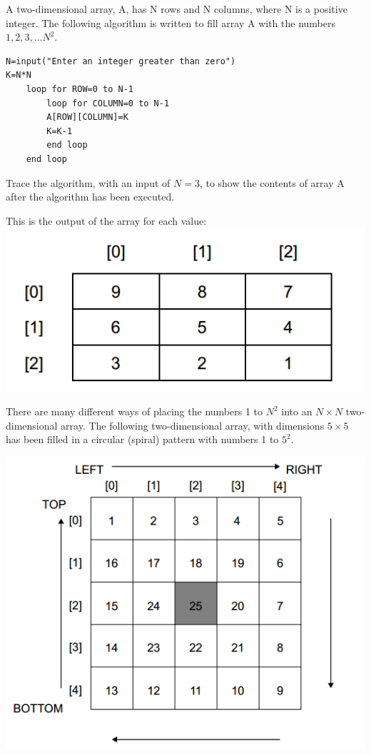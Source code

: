 \begin{exercise*}%
A two-dimensional array, A, has N rows and N columns, where N is a positive integer.
The following algorithm is written to fill array A with the numbers $1, 2, 3,\ldots N^2$.
\begin{verbatim}
N=input("Enter an integer greater than zero")
K=N*N
	loop for ROW=0 to N-1
		loop for COLUMN=0 to N-1
		A[ROW][COLUMN]=K
		K=K-1
		end loop
	end loop
\end{verbatim}

\begin{parts}
\item Trace the algorithm, with an input of $N=3$, to show the contents of array A after the algorithm has been executed.
	\begin{solution}
	This is the output of the array for each value:
	\includegraphics{topic_4_intro_programming/topic_4_exercises/arraySolution}
	\end{solution}
\end{parts}
There are many different ways of placing the numbers 1 to $N^2$ into an $N \times N$ two-dimensional array. 
The following two-dimensional array, with dimensions $5 \times 5$ has been filled in a circular (spiral) pattern with numbers 1 to $5^2$.

\includegraphics[scale=0.6]{topic_4_intro_programming/topic_4_exercises/array}
\newline


\end{exercise*}
